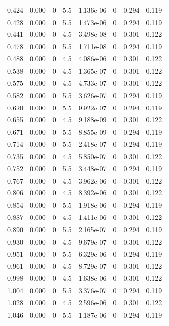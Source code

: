 \documentclass[preview]{standalone}
\begin{document}
{{\begin{tabular}{L{1.2cm}C{1.2cm} C{0.3cm}C{0.5cm} C{1.4cm}C{1.4cm} C{1.4cm}C{1.4cm}}
  0.424  &  0.000  & 0     & 5.5 &  1.136e-06  & 0  & 0.294 &  0.119   \\ 
  0.428  &  0.000  & 0     & 5.5 &  1.473e-06  & 0  & 0.294 &  0.119   \\ 
  0.441  &  0.000  & 0     & 4.5 &  3.498e-08  & 0  & 0.301 &  0.122   \\ 
  0.478  &  0.000  & 0     & 5.5 &  1.711e-08  & 0  & 0.294 &  0.119   \\ 
  0.488  &  0.000  & 0     & 4.5 &  4.086e-06  & 0  & 0.301 &  0.122   \\ 
  0.538  &  0.000  & 0     & 4.5 &  1.365e-07  & 0  & 0.301 &  0.122   \\ 
  0.575  &  0.000  & 0     & 4.5 &  4.733e-07  & 0  & 0.301 &  0.122   \\ 
  0.582  &  0.000  & 0     & 5.5 &  3.626e-07  & 0  & 0.294 &  0.119   \\ 
  0.620  &  0.000  & 0     & 5.5 &  9.922e-07  & 0  & 0.294 &  0.119   \\ 
  0.655  &  0.000  & 0     & 4.5 &  9.188e-09  & 0  & 0.301 &  0.122   \\ 
  0.671  &  0.000  & 0     & 5.5 &  8.855e-09  & 0  & 0.294 &  0.119   \\ 
  0.714  &  0.000  & 0     & 5.5 &  2.418e-07  & 0  & 0.294 &  0.119   \\ 
  0.735  &  0.000  & 0     & 4.5 &  5.850e-07  & 0  & 0.301 &  0.122   \\ 
  0.752  &  0.000  & 0     & 5.5 &  3.448e-07  & 0  & 0.294 &  0.119   \\ 
  0.767  &  0.000  & 0     & 4.5 &  3.962e-06  & 0  & 0.301 &  0.122   \\ 
  0.806  &  0.000  & 0     & 4.5 &  8.392e-06  & 0  & 0.301 &  0.122   \\ 
  0.854  &  0.000  & 0     & 5.5 &  1.918e-06  & 0  & 0.294 &  0.119   \\ 
  0.887  &  0.000  & 0     & 4.5 &  1.411e-06  & 0  & 0.301 &  0.122   \\ 
  0.890  &  0.000  & 0     & 5.5 &  2.165e-07  & 0  & 0.294 &  0.119   \\ 
  0.930  &  0.000  & 0     & 4.5 &  9.679e-07  & 0  & 0.301 &  0.122   \\ 
  0.951  &  0.000  & 0     & 5.5 &  6.329e-06  & 0  & 0.294 &  0.119   \\ 
  0.961  &  0.000  & 0     & 4.5 &  8.729e-07  & 0  & 0.301 &  0.122   \\ 
  0.998  &  0.000  & 0     & 4.5 &  1.638e-06  & 0  & 0.301 &  0.122   \\ 
  1.004  &  0.000  & 0     & 5.5 &  3.376e-07  & 0  & 0.294 &  0.119   \\ 
  1.028  &  0.000  & 0     & 4.5 &  2.596e-06  & 0  & 0.301 &  0.122   \\ 
  1.046  &  0.000  & 0     & 5.5 &  1.187e-06  & 0  & 0.294 &  0.119   \\ 
\hline 
\end{tabular} 

}}
\end{document}
